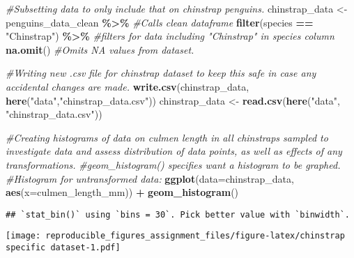 \documentclass[
]{article}
\newenvironment{Shaded}{\begin{snugshade}}{\end{snugshade}}
\newcommand{\AttributeTok}[1]{\textcolor[rgb]{0.13,0.29,0.53}{#1}}
\newcommand{\CommentTok}[1]{\textcolor[rgb]{0.56,0.35,0.01}{\textit{#1}}}
\newcommand{\FunctionTok}[1]{\textcolor[rgb]{0.13,0.29,0.53}{\textbf{#1}}}
\newcommand{\NormalTok}[1]{#1}
\newcommand{\OtherTok}[1]{\textcolor[rgb]{0.56,0.35,0.01}{#1}}
\newcommand{\SpecialCharTok}[1]{\textcolor[rgb]{0.81,0.36,0.00}{\textbf{#1}}}
\newcommand{\StringTok}[1]{\textcolor[rgb]{0.31,0.60,0.02}{#1}}
\begin{document}
\begin{Shaded}
\begin{Highlighting}[]
\CommentTok{\#Subsetting data to only include that on chinstrap penguins.}
\NormalTok{chinstrap\_data }\OtherTok{\textless{}{-}}\NormalTok{ penguins\_data\_clean }\SpecialCharTok{\%\textgreater{}\%} \CommentTok{\#Calls clean dataframe}
               \FunctionTok{filter}\NormalTok{(species }\SpecialCharTok{==} \StringTok{"Chinstrap"}\NormalTok{) }\SpecialCharTok{\%\textgreater{}\%} \CommentTok{\#filters for data including "Chinstrap" in species column}
               \FunctionTok{na.omit}\NormalTok{() }\CommentTok{\#Omits NA values from dataset.}

\CommentTok{\#Writing new .csv file for chinstrap dataset to keep this safe in case any accidental changes are made. }
\FunctionTok{write.csv}\NormalTok{(chinstrap\_data, }\FunctionTok{here}\NormalTok{(}\StringTok{"data"}\NormalTok{,}\StringTok{"chinstrap\_data.csv"}\NormalTok{))}
\NormalTok{chinstrap\_data }\OtherTok{\textless{}{-}} \FunctionTok{read.csv}\NormalTok{(}\FunctionTok{here}\NormalTok{(}\StringTok{"data"}\NormalTok{, }\StringTok{"chinstrap\_data.csv"}\NormalTok{))}

\CommentTok{\#Creating histograms of data on culmen length in all chinstraps sampled to investigate data and assess distribution of data points, as well as effects of any transformations.}
\CommentTok{\#geom\_histogram() specifies want a histogram to be graphed.}
\CommentTok{\#Histogram for untransformed data:}
\FunctionTok{ggplot}\NormalTok{(}\AttributeTok{data=}\NormalTok{chinstrap\_data, }\FunctionTok{aes}\NormalTok{(}\AttributeTok{x=}\NormalTok{culmen\_length\_mm)) }\SpecialCharTok{+} \FunctionTok{geom\_histogram}\NormalTok{()}
\end{Highlighting}
\end{Shaded}

\begin{verbatim}
## `stat_bin()` using `bins = 30`. Pick better value with `binwidth`.
\end{verbatim}

\texttt{[image: reproducible\_figures\_assignment\_files/figure-latex/chinstrap specific dataset-1.pdf]}

\begin{Shaded}
\end{Shaded}
\end{document}
